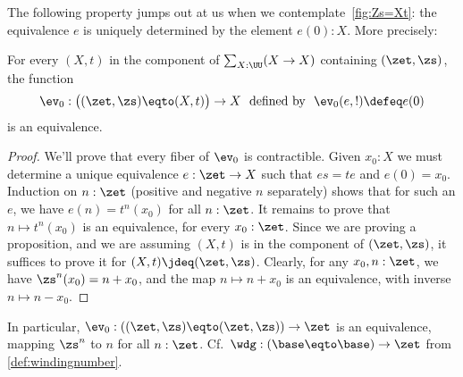 The following property jumps out at us when we contemplate~\cref{fig:Zs=Xt}:
the equivalence $e$ is uniquely determined by the element $e(0):X$.
More precisely:
\begin{lemma}
  \label{lem:IdCisZet}
For every $(X,t)$ in the component of $\sum_{X:\UU}(X\to X)$
containing $(\zet,\zs)$, the function
  \[
    \ev_0:\bigl((\zet,\zs)\eqto(X,t)\bigr)\to X
    \text{~~defined by~~} \ev_0(e,!) \defeq e(0)
  \]
  is an equivalence.
\end{lemma}
\begin{proof}
  We'll prove that every fiber of $\ev_0$ is contractible.
  Given $x_0:X$ we must determine a unique equivalence $e:\zet\to X$
  such that $es=te$ and $e(0)=x_0$.
  Induction on $n:\zet$ (positive and negative $n$ separately)
  shows that for such an $e$, we have $e(n) = t^n(x_0)$ for all $n:\zet$.
  It remains to prove that $n\mapsto t^n(x_0)$ is an equivalence,
  for every $x_0:\zet$. Since we are proving a proposition,
  and we are assuming $(X,t)$ is in the component of $(\zet,\zs)$,
  it suffices to prove it for $(X,t) \jdeq (\zet,\zs)$.
  Clearly, for any $x_0,n:\zet$, we have $\zs^n(x_0) = n + x_0$,
  and the map $n \mapsto n + x_0$ is an equivalence,
  with inverse $n \mapsto n - x_0$.
\end{proof}
In particular, $\ev_0: ((\zet,\zs)\eqto(\zet,\zs))\to \zet$ is an equivalence,
mapping $\zs^n$ to $n$ for all $n:\zet$. 
Cf.\ $\wdg : (\base\eqto\base)\to\zet$ from \cref{def:windingnumber}.

